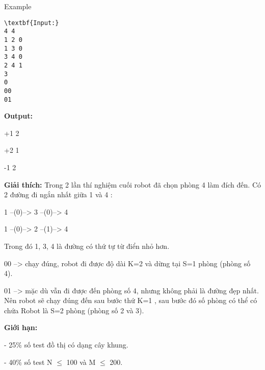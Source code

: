 Example
\begin{verbatim}
\textbf{Input:}
4 4
1 2 0
1 3 0
3 4 0
2 4 1
3
0
00
01\end{verbatim}

\textbf{Output:}


+1 2


+2 1


-1 2

\textbf{Giải thích: } Trong 2 lần thí nghiệm cuối robot đã chọn phòng 4 làm đích đến. Có 2 đường đi ngắn nhất giữa 1 và 4 :

1 --(0)--> 3 --(0)--> 4

1 --(0)--> 2 --(1)--> 4

Trong đó 1, 3, 4 là đường có thứ tự từ điển nhỏ hơn.

00 --> chạy đúng, robot đi được độ dài K=2 và dừng tại S=1 phòng (phòng số 4).

01 --> mặc dù vẫn đi được đến phòng số 4, nhưng không phải là đường đẹp nhất. Nên robot sẽ chạy đúng đến sau bước thứ K=1 , sau bước đó số phòng có thể có chứa Robot là S=2 phòng (phòng số 2 và 3).

\textbf{Giới hạn: }

- 25\% số test đồ thị có dạng cây khung.

- 40\% số test N $\le$ 100 và M $\le$ 200.